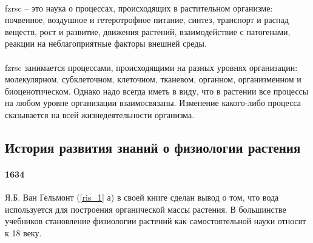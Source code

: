 \paragraph*{}

\paragraph*{}\gls{fzrsc} -- это наука о процессах, происходящих в растительном организме: почвенное, воздушное и гетеротрофное питание, синтез, транспорт и распад веществ, рост и развитие, движения растений, взаимодействие с патогенами, реакции на неблагоприятные факторы внешней среды. 


\paragraph*{}\gls{fzrsc} занимается процессами, происходящими на разных уровнях организации: молекулярном, субклеточном, клеточном, тканевом, органном, организменном и биоценотическом. Однако надо всегда иметь в виду, что в растении все процессы на любом уровне организации взаимосвязаны. Изменение какого-либо процесса сказывается на всей жизнедеятельности организма.

\subsection*{История развития знаний о физиологии растения}

\paragraph*{1634}  Я.Б. Ван Гельмонт (\ris \ref{ris_1} а) в своей книге сделан вывод о том, что вода используется для построения органической массы растения. В большинстве учебников становление физиологии растений как самостоятельной науки относят к 18 веку.


